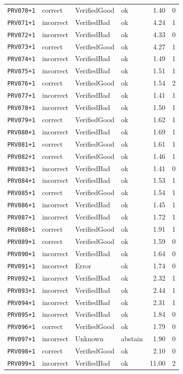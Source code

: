 \begin{longtable}{@{}l l l l r r@{}}
\texttt{PRV070{+}1} & correct & VerifiedGood & ok & 1.40 & 0 \\
\texttt{PRV071{+}1} & incorrect & VerifiedBad & ok & 4.24 & 1 \\
\texttt{PRV072{+}1} & incorrect & VerifiedBad & ok & 4.33 & 0 \\
\texttt{PRV073{+}1} & correct & VerifiedGood & ok & 4.27 & 1 \\
\texttt{PRV074{+}1} & incorrect & VerifiedBad & ok & 1.49 & 1 \\
\texttt{PRV075{+}1} & incorrect & VerifiedBad & ok & 1.51 & 1 \\
\texttt{PRV076{+}1} & correct & VerifiedGood & ok & 1.54 & 2 \\
\texttt{PRV077{+}1} & incorrect & VerifiedBad & ok & 1.41 & 1 \\
\texttt{PRV078{+}1} & incorrect & VerifiedBad & ok & 1.50 & 1 \\
\texttt{PRV079{+}1} & correct & VerifiedGood & ok & 1.62 & 1 \\
\texttt{PRV080{+}1} & incorrect & VerifiedBad & ok & 1.69 & 1 \\
\texttt{PRV081{+}1} & correct & VerifiedGood & ok & 1.61 & 1 \\
\texttt{PRV082{+}1} & correct & VerifiedGood & ok & 1.46 & 1 \\
\texttt{PRV083{+}1} & incorrect & VerifiedBad & ok & 1.41 & 0 \\
\texttt{PRV084{+}1} & incorrect & VerifiedBad & ok & 1.53 & 1 \\
\texttt{PRV085{+}1} & correct & VerifiedGood & ok & 1.54 & 1 \\
\texttt{PRV086{+}1} & incorrect & VerifiedBad & ok & 1.45 & 1 \\
\texttt{PRV087{+}1} & incorrect & VerifiedBad & ok & 1.72 & 1 \\
\texttt{PRV088{+}1} & correct & VerifiedGood & ok & 1.91 & 1 \\
\texttt{PRV089{+}1} & correct & VerifiedGood & ok & 1.59 & 0 \\
\texttt{PRV090{+}1} & incorrect & VerifiedBad & ok & 1.64 & 0 \\
\texttt{PRV091{+}1} & incorrect & Error & ok & 1.74 & 0 \\
\texttt{PRV092{+}1} & incorrect & VerifiedBad & ok & 2.32 & 1 \\
\texttt{PRV093{+}1} & incorrect & VerifiedBad & ok & 2.44 & 1 \\
\texttt{PRV094{+}1} & incorrect & VerifiedBad & ok & 2.31 & 1 \\
\texttt{PRV095{+}1} & incorrect & VerifiedBad & ok & 1.84 & 0 \\
\texttt{PRV096{+}1} & correct & VerifiedGood & ok & 1.79 & 0 \\
\texttt{PRV097{+}1} & incorrect & Unknown & abstain & 1.90 & 0 \\
\texttt{PRV098{+}1} & correct & VerifiedGood & ok & 2.10 & 0 \\
\texttt{PRV099{+}1} & incorrect & VerifiedBad & ok & 11.00 & 2 \\
\end{longtable}
